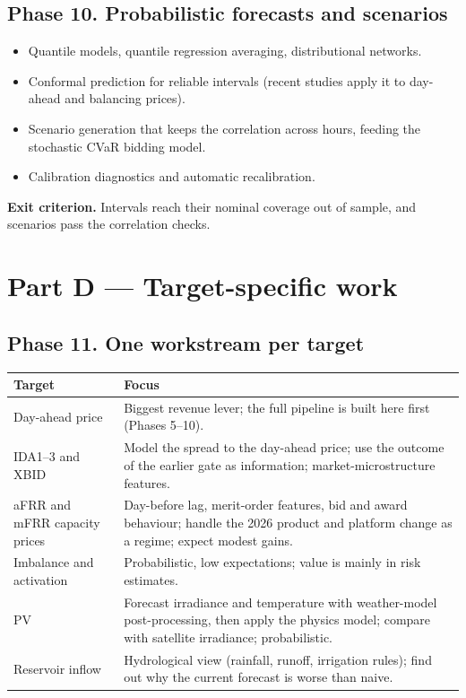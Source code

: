 \documentclass[11pt,a4paper]{article}
\newcommand{\exitcrit}[1]{\par\smallskip\noindent\colorbox{soft}{\parbox{\dimexpr\linewidth-2\fboxsep}{\textbf{Exit criterion.} #1}}\par}
\begin{document}
\subsection{Phase 10. Probabilistic forecasts and scenarios}
\begin{itemize}
\item Quantile models, quantile regression averaging, distributional networks.
\item Conformal prediction for reliable intervals (recent studies apply it to day-ahead and balancing prices).
\item Scenario generation that keeps the correlation across hours, feeding the stochastic CVaR bidding model.
\item Calibration diagnostics and automatic recalibration.
\end{itemize}
\exitcrit{Intervals reach their nominal coverage out of sample, and scenarios pass the correlation checks.}

\section{Part D --- Target-specific work}

\subsection{Phase 11. One workstream per target}
\begin{longtable}{>{\raggedright\arraybackslash}p{3.2cm}>{\raggedright\arraybackslash}p{12.2cm}}
\toprule
\textbf{Target} & \textbf{Focus}\\
\midrule
\endhead
Day-ahead price & Biggest revenue lever; the full pipeline is built here first (Phases 5--10).\\
IDA1--3 and XBID & Model the spread to the day-ahead price; use the outcome of the earlier gate as information; market-microstructure features.\\
aFRR and mFRR capacity prices & Day-before lag, merit-order features, bid and award behaviour; handle the 2026 product and platform change as a regime; expect modest gains.\\
Imbalance and activation & Probabilistic, low expectations; value is mainly in risk estimates.\\
PV & Forecast irradiance and temperature with weather-model post-processing, then apply the physics model; compare with satellite irradiance; probabilistic.\\
Reservoir inflow & Hydrological view (rainfall, runoff, irrigation rules); find out why the current forecast is worse than naive.\\
\bottomrule
\end{longtable}
\end{document}
